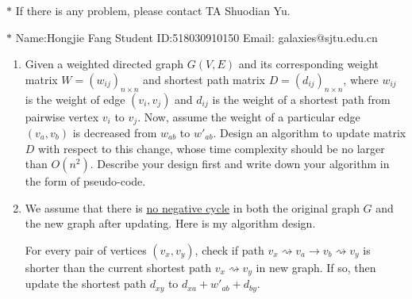 \documentclass[12pt,a4paper]{article}
\makeatletter
\newtheorem*{solution}{Solution}
\theoremstyle{definition}
\renewenvironment{solution}[1][Solution] {\par\pushQED{\qed}\normalfont\topsep6\p@\@plus6\p@\relax\trivlist\item[\hskip\labelsep\bfseries#1\@addpunct{.}]\ignorespaces}{\popQED\endtrivlist\@endpefalse} \makeatother
\makeatother
\begin{document}
\noindent

\noindent{}
\begin{center}
\footnotesize{\color{red}$*$ If there is any problem, please contact TA Shuodian Yu. }

\footnotesize{\color{blue}$*$ Name:Hongjie Fang  \quad Student ID:518030910150 \quad Email: galaxies@sjtu.edu.cn}
\end{center}
\begin{enumerate}
\item Given a weighted directed graph $G (V, E)$ and its corresponding weight matrix $W=(w_{ij})_{n \times n}$ and shortest path matrix $D=(d_{ij})_{n \times n}$, where $w_{ij}$ is the weight of edge $(v_i, v_j)$ and $d_{ij}$ is the weight of a shortest path from pairwise vertex $v_i$ to $v_j$. Now, assume the weight of a particular edge $(v_a, v_b)$ is decreased from $w_{ab}$ to $w'_{ab}$. Design an algorithm to update matrix $D$ with respect to this change, whose time complexity should be no larger than $O(n^2)$. Describe your design first and write down your algorithm in the form of pseudo-code.
    \begin{solution} We assume that there is \underline{no negative cycle} in both the original graph $G$ and the new graph after updating. Here is my algorithm design.

        For every pair of vertices $(v_x, v_y)$, check if path $v_x \rightsquigarrow v_a \rightarrow v_b \rightsquigarrow v_y$ is shorter than the current shortest path $v_x \rightsquigarrow v_y$ in new graph. If so, then update the shortest path $d_{xy}$ to $d_{xa} + w'_{ab} + d_{by}$.


\end{solution}
\end{enumerate}
\end{document}
